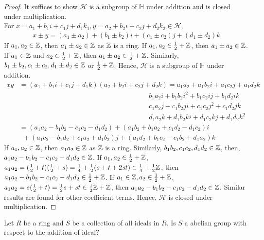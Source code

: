 \begin{proof}
    It suffices to show $\mathcal{H}$ is a subgroup of $\mathbb{H}$ under addition and
    is closed under multiplication.\\
    For $x=a_1+b_1i+c_1j+d_1k_1,y=a_2+b_2i+c_2j+d_2k_2\in\mathcal{H}$,
    \begin{align*}
        x\pm y = (a_1\pm a_2)+(b_1\pm b_2)i+(c_1\pm c_2)j+(d_1\pm d_2)k
    \end{align*} 
    If $a_1,a_2\in \mathbb{Z}$, then $a_1\pm a_2\in\mathbb{Z}$ as $\mathbb{Z}$ is a ring.
    If $a_1,a_2\in \frac{1}{2}+ \mathbb{Z}$, then $a_1\pm a_2\in \mathbb{Z}$.
    If $a_1\in\mathbb{Z}$ and $a_2\in \frac{1}{2}+ \mathbb{Z}$, then $a_1\pm a_2\in \frac{1}{2}+\mathbb{Z}$.
    Similarly, $b_1\pm b_2,c_1\pm c_2,d_1\pm d_2\in \mathbb{Z}$ or $\frac{1}{2}+\mathbb{Z}$.
    Hence, $\mathcal{H}$ is a subgroup of $\mathbb{H}$ under addition.
    \begin{align*}
        xy&=(a_1+b_1i+c_1j+d_1k)(a_2+b_2i+c_2j+d_2k)=a_1a_2+a_1b_2i+a_1c_2j+a_1d_2k\\
            &\hspace{8cm}                          b_1a_2i+b_1b_2i^2+b_1c_2ij+b_1d_2ik\\
            &\hspace{8cm}                          c_1a_2j+c_1b_2ji+c_1c_2j^2+c_1d_2jk\\
            &\hspace{8cm}                         d_1a_2k+d_1b_2ki+d_1c_2kj+d_1d_2k^2 \\
            &= (a_1a_2-b_1b_2-c_1c_2-d_1d_2)+(a_1b_2+b_1a_2+c_1d_2-d_1c_2)i \\
            &\ \ + (a_1c_2-b_1d_2+c_1a_2+d_1b_2)j + (a_1d_2+b_1c_2-c_1b_2+d_1a_2)k
    \end{align*}
    If $a_1,a_2\in\mathbb{Z}$, then $a_1a_2\in\mathbb{Z}$ as $\mathbb{Z}$ is a ring. Similarly, $b_1b_2,c_1c_2,d_1d_2\in \mathbb{Z}$, then, $a_1a_2-b_1b_2-c_1c_2-d_1d_2\in\mathbb{Z}$.
    If $a_1,a_2\in\frac{1}{2}+\mathbb{Z}$, $a_1a_2=(\frac{1}{2}+t)(\frac{1}{2}+s)=\frac{1}{4}+\frac{1}{2}(s+t+2st)\in\frac{1}{4}+\frac{1}{2}\mathbb{Z}$, 
    then $a_1a_2-b_1b_2-c_1c_2-d_1d_2\in \frac{1}{2}+\mathbb{Z}$.
    If $a_1\in\mathbb{Z},a_2\in\frac{1}{2}+\mathbb{Z}$, $a_1a_2=s(\frac{1}{2}+t)=\frac{1}{2}s+st\in\frac{1}{2}\mathbb{Z}+\mathbb{Z}$, 
    then $a_1a_2-b_1b_2-c_1c_2-d_1d_2\in \mathbb{Z}$. Similar results are found for other coefficient terms. 
    Hence, $\mathcal{H}$ is closed under multiplication.
\end{proof}

\begin{exercise}{}{}
    Let $R$ be a ring and $S$ be a collection of all ideals in $R$. 
    Is $S$ a abelian group with respect to the addition of ideal? 
\end{exercise}

